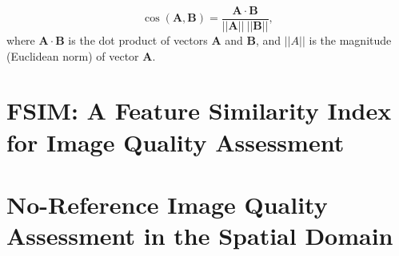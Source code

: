 \begin{equation}
  \cos(\mathbf{A}, \mathbf{B}) = \frac{\mathbf{A}\cdot\mathbf{B}}{||\mathbf{A}||~||\mathbf{B}||},
\end{equation}
where $\mathbf{A}\cdot\mathbf{B}$ is the dot product of vectors
$\mathbf{A}$ and $\mathbf{B}$, and $||A||$ is the magnitude (Euclidean
norm) of vector $\mathbf{A}$.

\section{FSIM: A Feature Similarity Index for Image Quality Assessment}
\cite{zhang2011fsim}

\section{No-Reference Image Quality Assessment in the Spatial Domain}
\cite{mittal2012no}

